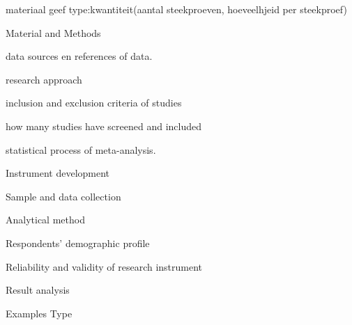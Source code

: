 

materiaal
geef type:kwantiteit(aantal steekproeven, hoeveelhjeid per steekproef)


Material and Methods


data sources en references of data. 


research approach

inclusion and exclusion criteria of studies

how many studies have screened and included 

statistical process of meta-analysis.

Instrument development

Sample and data collection

Analytical method

Respondents’ demographic profile

Reliability and validity of research instrument

Result analysis

Examples
Type  

